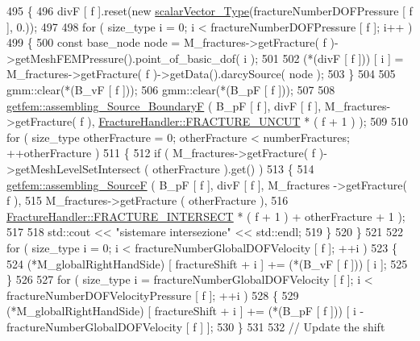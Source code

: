 \begin{DoxyCode}
495     \{
496         divF [ f ].reset(\textcolor{keyword}{new} \hyperlink{Core_8h_a4e75b5863535ba1dd79942de2846eff0}{scalarVector\_Type}(fractureNumberDOFPressure [ f ], 0.));
497 
498         \textcolor{keywordflow}{for} ( size\_type i = 0; i < fractureNumberDOFPressure [ f ]; i++ )
499         \{
500             \textcolor{keyword}{const} base\_node node = M\_fractures->getFracture( f )->getMeshFEMPressure().point\_of\_basic\_dof( 
      i );
501 
502             (*(divF [ f ])) [ i ] = M\_fractures->getFracture( f )->getData().darcySource( node );
503         \}
504 
505         gmm::clear(*(B\_vF [ f ]));
506         gmm::clear(*(B\_pF [ f ]));
507 
508         \hyperlink{namespacegetfem_ac08fe08fb325eede94ffe4968b7980de}{getfem::assembling\_Source\_BoundaryF} ( B\_pF [ f ], divF [ f ], 
      M\_fractures->getFracture( f ), \hyperlink{classFractureHandler_a495ad4fc72d0c47c8f0424842f1153aaaa992cc3ad024a030ecd798dc319c95ac}{FractureHandler::FRACTURE\_UNCUT} * ( f + 1 ) );
509 
510         \textcolor{keywordflow}{for} ( size\_type otherFracture = 0; otherFracture < numberFractures; ++otherFracture )
511         \{
512             \textcolor{keywordflow}{if} ( M\_fractures->getFracture( f )->getMeshLevelSetIntersect ( otherFracture ).get() )
513             \{
514                 \hyperlink{namespacegetfem_a5efeefe94dfb5427c3ecf63d0b342c57}{getfem::assembling\_SourceF} ( B\_pF [ f ], divF [ f ], M\_fractures
      ->getFracture( f ),
515                                              M\_fractures->getFracture ( otherFracture ),
516                                              \hyperlink{classFractureHandler_a495ad4fc72d0c47c8f0424842f1153aaa781cae3f3b99bf9357fed2833d315537}{FractureHandler::FRACTURE\_INTERSECT}
       * ( f + 1 ) + otherFracture + 1 );
517                                              
518                 std::cout << \textcolor{stringliteral}{"sistemare intersezione"} << std::endl;
519             \}
520         \}
521 
522         \textcolor{keywordflow}{for} ( size\_type i = 0; i < fractureNumberGlobalDOFVelocity [ f ]; ++i )
523         \{
524             (*M\_globalRightHandSide) [ fractureShift + i ] += (*(B\_vF [ f ])) [ i ];
525         \}
526 
527         \textcolor{keywordflow}{for} ( size\_type i = fractureNumberGlobalDOFVelocity [ f ]; i < fractureNumberDOFVelocityPressure [ 
      f ]; ++i )
528         \{
529                 (*M\_globalRightHandSide) [ fractureShift + i ] += (*(B\_pF [ f ])) [ i - 
      fractureNumberGlobalDOFVelocity [ f ] ];
530         \}
531        
532         \textcolor{comment}{// Update the shift}

\end{DoxyCode}
